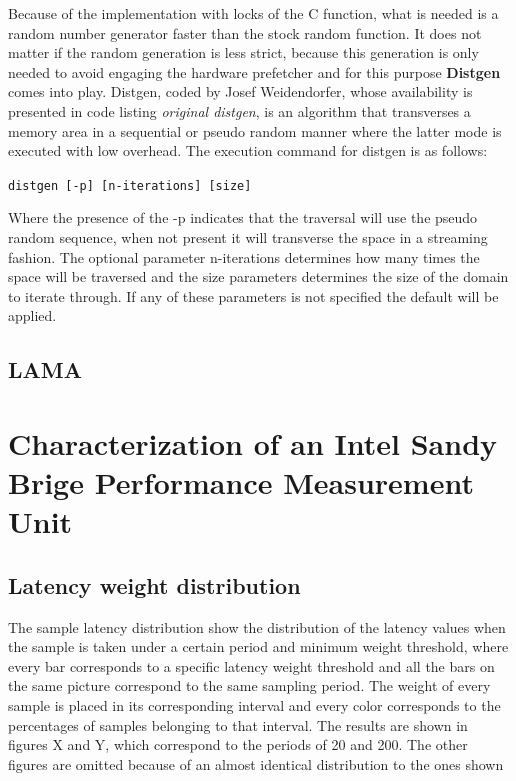 Because of the implementation with locks of the C function, what is needed is a random number generator faster than the stock random function. It does not matter if the random generation is less strict, because this generation is only needed to avoid engaging the hardware prefetcher and for this purpose \textbf{Distgen} comes into play. Distgen, coded by Josef Weidendorfer, whose availability is presented in code listing \textit{original distgen}, is an algorithm that transverses a memory area in a sequential or pseudo random manner where the latter mode is executed with low overhead. The execution command for distgen is as follows:
\begin{center}
\texttt{distgen [-p] [n-iterations] [size]}
\end{center}

Where the presence of the -p indicates that the traversal will use the pseudo random sequence, when not present it will transverse the space in a streaming fashion. The optional parameter n-iterations determines how many times the space will be traversed and the size parameters determines the size of the domain to iterate through. If any of these parameters is not specified the default will be applied.

\subsection{LAMA}\label{section:Lama}

\section{Characterization of an Intel Sandy Brige Performance Measurement Unit}\label{section:pmu-charzn}

\subsection{Latency weight distribution}\label{subsection:pmu-latwei}

The sample latency distribution show the distribution of the latency values when the sample is taken under a certain period and minimum weight threshold, where every bar corresponds to a specific latency weight threshold and all the bars on the same picture correspond to the same sampling period. The weight of every sample is placed in its corresponding interval and every color corresponds to the percentages of samples belonging to that interval.  The results are shown in figures X and Y, which correspond to the periods of 20 and 200. The other figures are omitted because of an almost identical distribution to the ones shown

